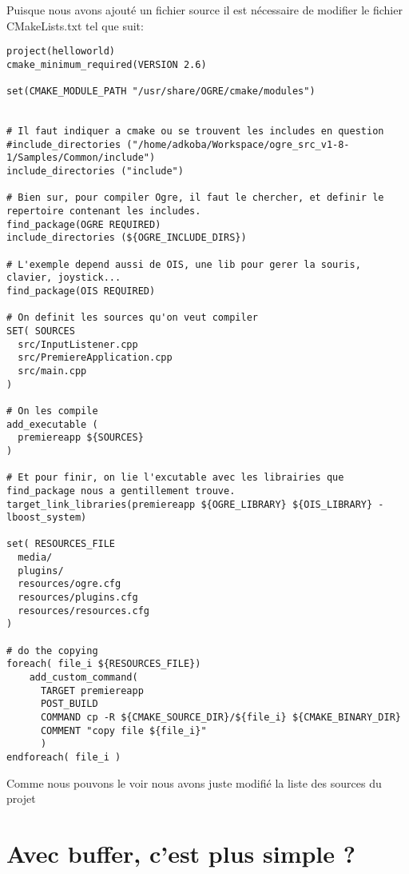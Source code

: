 Puisque nous avons ajout\'e un fichier source il est n\'ecessaire de modifier le fichier CMakeLists.txt tel que suit:

\begin{lstlisting}[caption={CMakeLists.txt}]
project(helloworld)
cmake_minimum_required(VERSION 2.6)

set(CMAKE_MODULE_PATH "/usr/share/OGRE/cmake/modules")


# Il faut indiquer a cmake ou se trouvent les includes en question
#include_directories ("/home/adkoba/Workspace/ogre_src_v1-8-1/Samples/Common/include")
include_directories ("include")

# Bien sur, pour compiler Ogre, il faut le chercher, et definir le repertoire contenant les includes.
find_package(OGRE REQUIRED)
include_directories (${OGRE_INCLUDE_DIRS})

# L'exemple depend aussi de OIS, une lib pour gerer la souris, clavier, joystick...
find_package(OIS REQUIRED)

# On definit les sources qu'on veut compiler
SET( SOURCES
  src/InputListener.cpp  
  src/PremiereApplication.cpp
  src/main.cpp
)

# On les compile
add_executable (
  premiereapp ${SOURCES}
)

# Et pour finir, on lie l'excutable avec les librairies que find_package nous a gentillement trouve.
target_link_libraries(premiereapp ${OGRE_LIBRARY} ${OIS_LIBRARY} -lboost_system)

set( RESOURCES_FILE
  media/
  plugins/
  resources/ogre.cfg
  resources/plugins.cfg
  resources/resources.cfg
)

# do the copying
foreach( file_i ${RESOURCES_FILE})
    add_custom_command(
      TARGET premiereapp
      POST_BUILD
      COMMAND cp -R ${CMAKE_SOURCE_DIR}/${file_i} ${CMAKE_BINARY_DIR}
      COMMENT "copy file ${file_i}"
      )
endforeach( file_i )
\end{lstlisting}

Comme nous pouvons le voir nous avons juste modifi\'e la liste des sources du projet












\section{Avec buffer, c'est plus simple ?}

